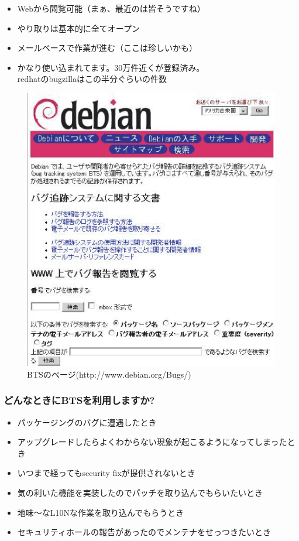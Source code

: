 \documentclass[mingoth,a4paper]{jsarticle}
\begin{document}
\begin{itemize}
\item Webから閲覧可能（まぁ、最近のは皆そうですね）
\item やり取りは基本的に全てオープン
\item メールベースで作業が進む（ここは珍しいかも）
\item かなり使い込まれてます。30万件近くが登録済み。\\
redhatのbugzillaはこの半分ぐらいの件数
\end{itemize}

\begin{figure}[htbp]
\begin{center}
\includegraphics{image200508/bts.eps}
\end{center}
\caption{BTSのページ(http://www.debian.org/Bugs/)}
\label{bts-webpage}
\end{figure}

\subsubsection{どんなときにBTSを利用しますか?}

\begin{itemize}
\item パッケージングのバグに遭遇したとき
\item アップグレードしたらよくわからない現象が起こるようになってしまったとき
\item いつまで経ってもsecurity fixが提供されないとき
\item 気の利いた機能を実装したのでパッチを取り込んでもらいたいとき
\item 地味〜なL10Nな作業を取り込んでもらうとき
\item セキュリティホールの報告があったのでメンテナをせっつきたいとき
\end{itemize}
\end{document}
